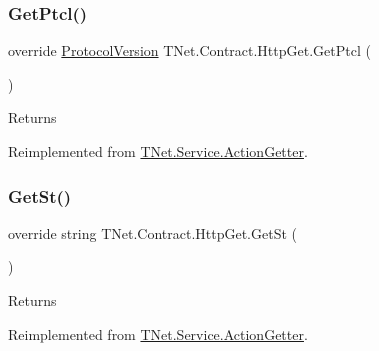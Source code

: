 \subsubsection{\texorpdfstring{Get\+Ptcl()}{GetPtcl()}}
{\footnotesize\ttfamily override \mbox{\hyperlink{namespace_t_net_1_1_service_a6651119df6dac62b849ed58cf7ece2bd}{Protocol\+Version}} T\+Net.\+Contract.\+Http\+Get.\+Get\+Ptcl (\begin{DoxyParamCaption}{ }\end{DoxyParamCaption})\hspace{0.3cm}{\ttfamily [virtual]}}





\begin{DoxyReturn}{Returns}

\end{DoxyReturn}


Reimplemented from \mbox{\hyperlink{class_t_net_1_1_service_1_1_action_getter_aea751fe82e12246f5be7105d8c8c068c}{T\+Net.\+Service.\+Action\+Getter}}.

\mbox{\label{class_t_net_1_1_contract_1_1_http_get_ac2e53bdcb1a579f28ac4002ab15e6bb3}} 
\subsubsection{\texorpdfstring{Get\+St()}{GetSt()}}
{\footnotesize\ttfamily override string T\+Net.\+Contract.\+Http\+Get.\+Get\+St (\begin{DoxyParamCaption}{ }\end{DoxyParamCaption})\hspace{0.3cm}{\ttfamily [virtual]}}





\begin{DoxyReturn}{Returns}

\end{DoxyReturn}


Reimplemented from \mbox{\hyperlink{class_t_net_1_1_service_1_1_action_getter_a28cf34ec64abdebcdadbdc0fbc6163b9}{T\+Net.\+Service.\+Action\+Getter}}.

\mbox{\label{class_t_net_1_1_contract_1_1_http_get_a886857fce91c42ba48baae7979e7d3cb}} 
